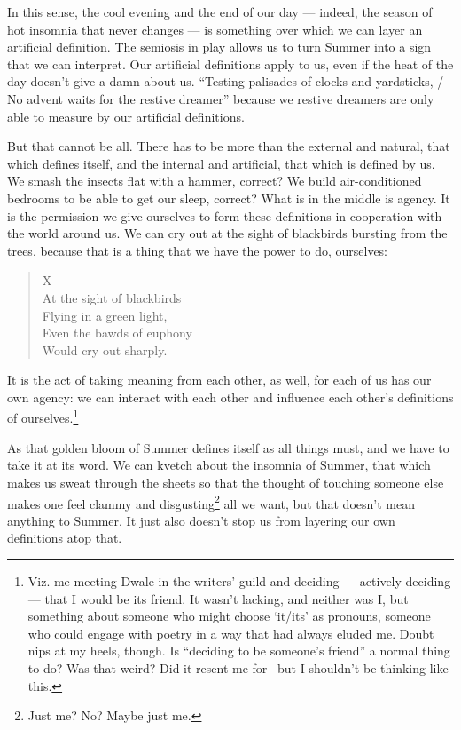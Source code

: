 \documentclass[12pt,oneside]{memoir}
\begin{document}
In this sense, the cool evening and the end of our day --- indeed, the season of hot insomnia that never changes --- is something over which we can layer an artificial definition. The semiosis in play allows us to turn Summer into a sign that we can interpret. Our artificial definitions apply to us, even if the heat of the day doesn't give a damn about us. ``Testing palisades of clocks and yardsticks, / No advent waits for the restive dreamer'' because we restive dreamers are only able to measure by our artificial definitions.

But that cannot be all. There has to be more than the external and natural, that which defines itself, and the internal and artificial, that which is defined by us. We smash the insects flat with a hammer, correct? We build air-conditioned bedrooms to be able to get our sleep, correct? What is in the middle is agency. It is the permission we give ourselves to form these definitions in cooperation with the world around us. We can cry out at the sight of blackbirds bursting from the trees, because that is a thing that we have the power to do, ourselves:

\begin{verse}
X \\
At the sight of blackbirds \\
Flying in a green light, \\
Even the bawds of euphony \\
Would cry out sharply.

\parencite{blackbird}
\end{verse}

It is the act of taking meaning from each other, as well, for each of us has our own agency: we can interact with each other and influence each other's definitions of ourselves.\footnote{Viz. me meeting Dwale in the writers' guild and deciding --- actively deciding --- that I would be its friend. It wasn't lacking, and neither was I, but something about someone who might choose `it/its' as pronouns, someone who could engage with poetry in a way that had always eluded me. Doubt nips at my heels, though. Is ``deciding to be someone's friend'' a normal thing to do? Was that weird? Did it resent me for-- but I shouldn't be thinking like this.}

As that golden bloom of Summer defines itself as all things must, and we have to take it at its word. We can kvetch about the insomnia of Summer, that which makes us sweat through the sheets so that the thought of touching someone else makes one feel clammy and disgusting\footnote{Just me? No? Maybe just me.} all we want, but that doesn't mean anything to Summer. It just also doesn't stop us from layering our own definitions atop that.
\end{document}
